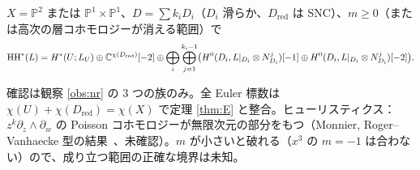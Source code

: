 \begin{conj}[非被約な境界]\tK\label{conj:NR}
$X=\mathbb P^2$ または $\mathbb P^1\times\mathbb P^1$、$D=\sum k_iD_i$（$D_i$ 滑らか、$D_{\mathrm{red}}$ は SNC）、$m\ge0$（または高次の層コホモロジーが消える範囲）で
\[\mathrm{HH}^*(L)=H^*(U;L_U)\oplus\mathbb C^{\chi(D_{\mathrm{red}})}[-2]\oplus\bigoplus_i\bigoplus_{j=1}^{k_i-1}\bigl(H^0(D_i,L|_{D_i}\otimes N_{D_i}^{j})[-1]\oplus H^0(D_i,L|_{D_i}\otimes N_{D_i}^{j})[-2]\bigr).\]
\end{conj}
\noindent 確認は観察 \ref{obs:nr} の 3 つの族のみ。全 Euler 標数は $\chi(U)+\chi(D_{\mathrm{red}})=\chi(X)$ で定理 \ref{thm:E} と整合。ヒューリスティクス：$z^k\partial_z\wedge\partial_w$ の Poisson コホモロジーが無限次元の部分をもつ（Monnier, Roger--Vanhaecke 型の結果\tC\ \tQ、未確認）。$m$ が小さいと破れる（$x^3$ の $m=-1$ は合わない）ので、成り立つ範囲の正確な境界は未知。
